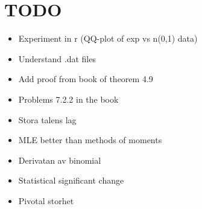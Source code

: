 \section{TODO}\par
\begin{itemize}
  \item Experiment in r (QQ-plot of exp vs n(0,1) data)
  \item Understand .dat files
  \item Add proof from book of theorem 4.9 
  \item Problems 7.2.2 in the book
  \item Stora talens lag
  \item MLE better than methods of moments
  \item Derivatan av binomial
  \item Statistical significant change
  \item Pivotal storhet
\end{itemize}
